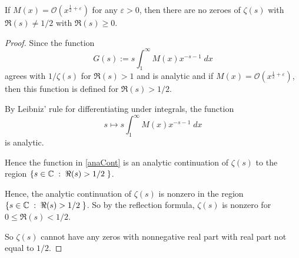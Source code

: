 \documentclass{unswmaths}
\begin{document}
\begin{theorem}
    If $M(x) = \mathcal{O}(x^{\frac{1}{2}+\varepsilon})$ for any $\varepsilon > 0$, then 
    there are no zeroes of $\zeta(s)$ with $\Re(s) \neq 1/2$ with $\Re(s) \geq 0$.
\end{theorem}
\begin{proof}
    Since the function
    \begin{equation*}
        G(s) := s\int_{1}^\infty M(x)x^{-s-1}\;dx
    \end{equation*}
    agrees with $1/\zeta(s)$ for $\Re(s) > 1$ and is analytic and if $M(x) = \mathcal{O}(x^{\frac{1}{2}+\varepsilon})$,
    then this function is defined for $\Re(s) > 1/2$. 
    
    By Leibniz' rule for differentiating under integrals, the function
    \begin{equation}
    \label{anaCont}
        s\mapsto s\int_{1}^\infty M(x)x^{-s-1}\;dx
    \end{equation}
    is analytic.
    
    Hence the function in \ref{anaCont} is an analytic continuation 
    of $\zeta(s)$ to the region $\{s \in \mathbb{C}\;:\;\Re(s) > 1/2\;\}$.
    
    Hence, the analytic continuation of $\zeta(s)$ is nonzero in the region $\{s \in \mathbb{C}\;:\;\Re(s) > 1/2\;\}$. 
    So by the reflection formula, $\zeta(s)$ is nonzero for $0 \leq \Re(s) < 1/2$. 
    
    So $\zeta(s)$ cannot have any zeros with nonnegative real part with real part not equal to $1/2$.
\end{proof}
\end{document}
